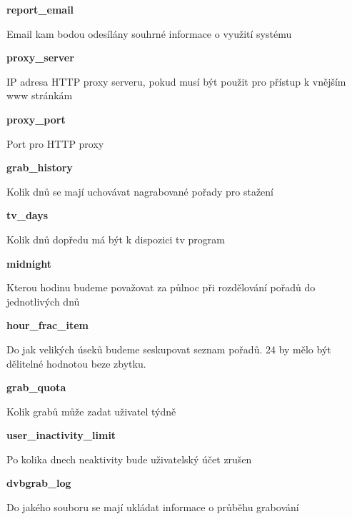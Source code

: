 \vspace{10pt}

\textbf{report\_email}

Email kam bodou odesílány souhrné informace o využití systému

\vspace{10pt}

\textbf{proxy\_server}

IP adresa HTTP proxy serveru, pokud musí být použit pro přístup k vnějším www stránkám

\vspace{10pt}

\textbf{proxy\_port}

Port pro HTTP proxy

\vspace{10pt}

\textbf{grab\_history}

Kolik dnů se mají uchovávat nagrabované pořady pro stažení

\vspace{10pt}

\textbf{tv\_days}

Kolik dnů dopředu má být k dispozici tv program

\vspace{10pt}

\textbf{midnight}

Kterou hodinu budeme považovat za půlnoc při rozdělování pořadů do jednotlivých dnů

\vspace{10pt}

\textbf{hour\_frac\_item}

Do jak velikých úseků budeme seskupovat seznam pořadů. 24 by mělo být dělitelné hodnotou beze zbytku.

\vspace{10pt}

\textbf{grab\_quota}

Kolik grabů může zadat uživatel týdně

\vspace{10pt}

\textbf{user\_inactivity\_limit}

Po kolika dnech neaktivity bude uživatelský účet zrušen

\vspace{10pt}

\textbf{dvbgrab\_log}

Do jakého souboru se mají ukládat informace o průběhu grabování

